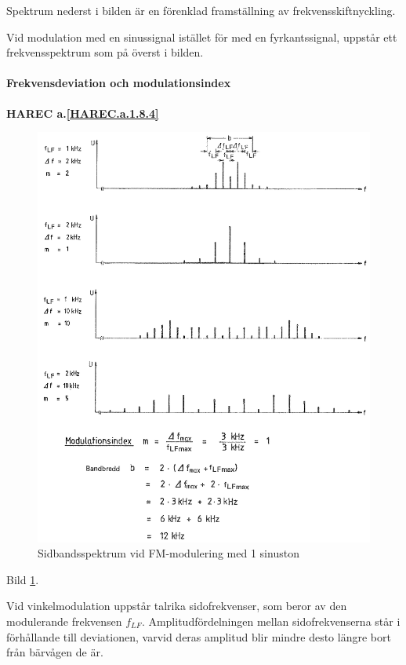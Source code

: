 Spektrum nederst i bilden är en förenklad framställning av
frekvensskiftnyckling.

Vid modulation med en sinussignal istället för med en fyrkantssignal, uppstår ett
frekvensspektrum som på överst i bilden.

\paragraph{Frekvensdeviation och modulationsindex}
\textbf{HAREC a.\ref{HAREC.a.1.8.4}\label{myHAREC.a.1.8.4}}

\begin{figure}
\includegraphics[width=\textwidth]{images/cropped_pdfs/bild_2_1-31.pdf}
\caption{Sidbandsspektrum vid FM-modulering med 1 sinuston}
\label{fig:BildII1-31}
\end{figure}

Bild \ref{fig:BildII1-31}.

Vid vinkelmodulation uppstår talrika sidofrekvenser, som beror av den
modulerande frekvensen \(f_{LF}\). Amplitudfördelningen mellan sidofrekvenserna
står i förhållande till deviationen, varvid deras amplitud blir mindre desto
längre bort från bärvågen de är.

